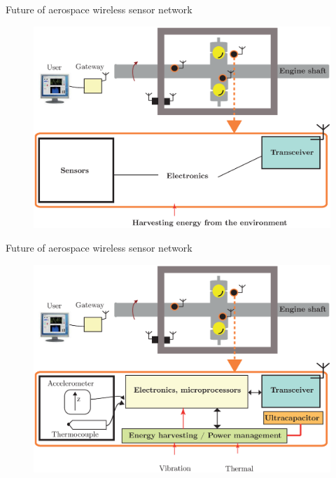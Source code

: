 \documentclass[LaTeX2e,10pt]{beamer}
\begin{document}
\begin{frame}{Future of aerospace wireless sensor network}
\vskip-5pt %
\begin{figure}[h!]
	\centering
		\includegraphics[width=\linewidth]{./Images/I2BS-3.eps}
\end{figure}
\end{frame}
\begin{frame}{Future of aerospace wireless sensor network}
\vskip-5pt %
\begin{figure}[h!]
	\centering
		\includegraphics[width=\linewidth]{./Images/I2BS-4.eps}
\end{figure}
\end{frame}
\end{document}
